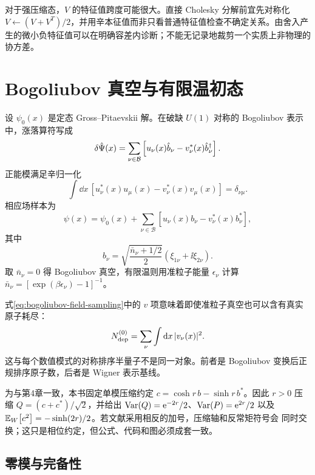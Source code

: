 对于强压缩态，$V$ 的特征值跨度可能很大。直接 Cholesky 分解前宜先对称化 $V\leftarrow(V+V^T)/2$，并用辛本征值而非只看普通特征值检查不确定关系。由舍入产生的微小负特征值可以在明确容差内诊断；不能无记录地裁剪一个实质上非物理的协方差。

\section{Bogoliubov 真空与有限温初态}

设 $\psi_0(x)$ 是定态 Gross--Pitaevskii 解。在破缺 $U(1)$ 对称的 Bogoliubov 表示中，涨落算符写成
\begin{equation}
  \delta\hat{\Psi}(x)=
  \sum_{\nu\in\mathcal B}
  \left[u_\nu(x)\hat b_\nu-v_\nu^*(x)\hat b^{\dagger}_\nu\right].
  \label{eq:bogoliubov-expansion}
\end{equation}
正能模满足辛归一化
\begin{equation}
  \int\dd x\,
  \left[u_\nu^*(x)u_\mu(x)-v_\nu^*(x)v_\mu(x)\right]
  =\delta_{\nu\mu}.
  \label{eq:bogoliubov-normalization}
\end{equation}
相应场样本为
\begin{equation}
  \psi(x)=\psi_0(x)+
  \sum_{\nu\in\mathcal B}
  \left[u_\nu(x)b_\nu-v_\nu^*(x)b_\nu^*\right],
  \label{eq:bogoliubov-field-sampling}
\end{equation}
其中
\begin{equation}
  b_\nu=\sqrt{\frac{\bar n_\nu+1/2}{2}}
  (\xi_{1\nu}+\ii\xi_{2\nu}).
  \label{eq:bogoliubov-mode-sampling}
\end{equation}
取 $\bar n_\nu=0$ 得 Bogoliubov 真空，有限温则用准粒子能量 $\epsilon_\nu$ 计算
$\bar n_\nu=[\exp(\beta\epsilon_\nu)-1]^{-1}$。

式\eqref{eq:bogoliubov-field-sampling}中的 $v$ 项意味着即使准粒子真空也可以含有真实原子耗尽：
\begin{equation}
  N_{\rm dep}^{(0)}=\sum_\nu\int\mathop{}\!\mathrm{d} x\,|v_\nu(x)|^2.
  \label{eq:quantum-depletion}
\end{equation}
这与每个数值模式的对称排序半量子不是同一对象。前者是 Bogoliubov 变换后正规排序原子数，后者是 Wigner 表示基线。

为与第4章一致，本书固定单模压缩约定
$c=\cosh r\,b-\sinh r\,b^*$。因此 $r>0$ 压缩
$Q=(c+c^*)/\sqrt2$，并给出
$\operatorname{Var}(Q)=\mathrm{e}^{-2r}/2$、$\operatorname{Var}(P)=\mathrm{e}^{2r}/2$ 以及
$\mathbb{E}_{W}\!\left[c^2\right]=-\sinh(2r)/2$。若文献采用相反的加号，压缩轴和反常矩符号会
同时交换；这只是相位约定，但公式、代码和图必须成套一致。

\subsection{零模与完备性}

